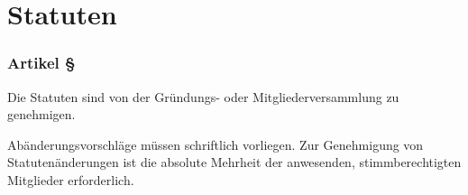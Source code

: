 \section{Statuten}

\subsubsection*{Artikel §\articlenumber}
Die Statuten sind von der Gründungs- oder Mitgliederversammlung zu genehmigen.

Abänderungsvorschläge müssen schriftlich vorliegen. Zur Genehmigung von
Statutenänderungen ist die absolute Mehrheit der anwesenden, stimmberechtigten
Mitglieder erforderlich.
